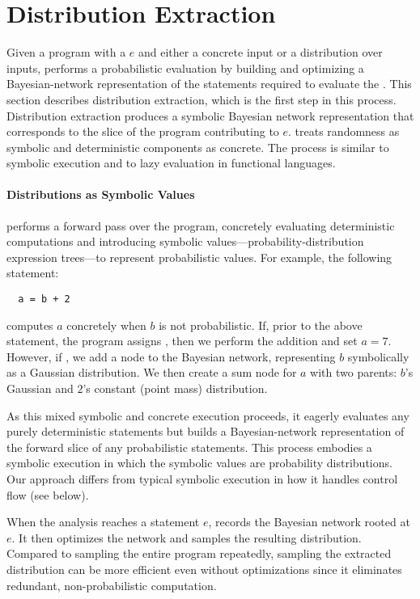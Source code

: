 \section{Distribution Extraction} 
\label{passert:sec:distex}


Given a program with a \passert $e$ and either a concrete input or a
distribution over inputs,
\tool performs a probabilistic evaluation
by building and optimizing a Bayesian-network representation of the statements
required to evaluate the \passert.  This section describes
distribution extraction, which is the first step in this process.
Distribution extraction produces a symbolic Bayesian network representation
that corresponds to the slice of the program contributing to $e$.
\tool treats randomness as symbolic and
deterministic components as concrete.
The process is similar to symbolic execution and to lazy evaluation in
functional languages.

\paragraph{Distributions as Symbolic Values}
\mayhap performs a forward pass over the program, concretely
evaluating deterministic computations and introducing symbolic
values---probability-distribution expression trees---to represent
probabilistic values. For example, the following statement: 
%
\begin{lstlisting}
  a = b + 2
\end{lstlisting}
%
computes $a$ concretely when $b$ is not probabilistic.  If, prior to the above
statement, the program assigns , then we perform the
addition and set $a=7$.  However, if , we
add a node to the Bayesian network, representing $b$
symbolically as a Gaussian distribution.  We then create a sum node for
$a$ with two parents: $b$'s Gaussian  and $2$'s constant (point mass) distribution.

As this mixed symbolic and concrete execution proceeds, it eagerly
evaluates any purely deterministic statements but builds a Bayesian-network
representation
of the forward slice of any probabilistic statements.  This
process embodies a symbolic execution in which the symbolic values are
probability distributions. Our approach differs from typical symbolic
execution
in how it handles control flow (see below).  

When the analysis reaches a statement \passert $e$, \mayhap records the Bayesian network
rooted at $e$. It then optimizes the network and samples the
resulting distribution.
Compared to sampling the entire program repeatedly, sampling the extracted
distribution can be more efficient even without optimizations since it
eliminates redundant, non-probabilistic
computation. 

